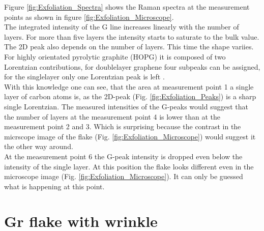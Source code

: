 \documentclass[12pt,a4paper]{article}
\begin{document}
Figure \ref{fig:Exfoliation_Spectra} shows the Raman spectra at the measurement points as shown in figure \ref{fig:Exfoliation_Microscope}. \\
The integrated intensity of the G line increases linearly with the number of layers. For more than five layers the intensity starts to saturate to the bulk value. The 2D peak also depends on the number of layers. This time the shape variies. For highly orientated pyrolytic graphite (HOPG) it is composed of two Lorentzian contributions, for doublelayer graphene four subpeaks can be assigned, for the singlelayer only one Lorentzian peak is left \cite{Lett_2007}. \\
With this knowledge one can see, that the area at measurement point 1 a single layer of carbon atoms is, as the 2D-peak (Fig. \ref{fig:Exfoliation_Peaks}) is a sharp single Lorentzian. The measured intensities of the G-peaks would suggest that the number of layers at the measurement point 4 is lower than at the measurement point 2 and 3. Which is surprising because the contrast in the micrscope image of the flake (Fig. \ref{fig:Exfoliation_Microscope}) would suggest it the other way around. \\
At the measurement point 6 the G-peak intensity is dropped even below the intensity of the single layer. At this position the flake looks different even in the microscope image (Fig. \ref{fig:Exfoliation_Microscope}). It can only be guessed what is happening at this point.



\section{Gr flake with wrinkle}
\end{document}
